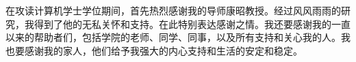 \documentclass[bachelor]{thesis-uestc}
\begin{document}
\thesisacknowledgement
在攻读计算机学士学位期间，首先热烈感谢我的导师康昭教授。经过风风雨雨的研究，我得到了他的无私关怀和支持。在此特别表达感谢之情。我还要感谢我的一直以来的帮助者们，包括学院的老师、同学、同事，以及所有支持和关心我的人。我也要感谢我的家人，他们给予我强大的内心支持和生活的安定和稳定。

%

%
%






\end{document}
